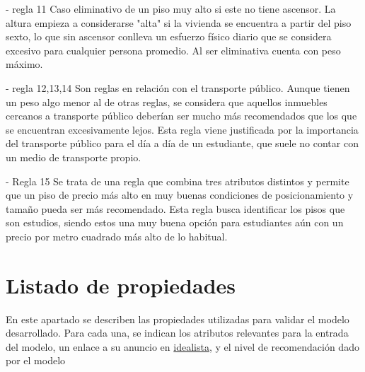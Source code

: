 \documentclass[12pt]{report} %
\begin{document}
    - regla 11
    Caso eliminativo de un piso muy alto si este no tiene ascensor. La altura empieza a 
    considerarse "alta" si la vivienda se encuentra a partir del piso sexto, lo que sin ascensor 
    conlleva un esfuerzo físico diario que se considera excesivo para cualquier persona promedio. 
    Al ser eliminativa cuenta con peso máximo.

    - regla 12,13,14
    Son reglas en relación con el transporte público. Aunque tienen un peso algo menor al de otras
    reglas, se considera que aquellos inmuebles cercanos a transporte público deberían ser mucho 
    más recomendados que los que se encuentran excesivamente lejos. Esta regla viene justificada
    por la importancia del transporte público para el día a día de un estudiante, que suele no contar 
    con un medio de transporte propio.

    - Regla 15
    Se trata de una regla que combina tres atributos distintos y permite que un piso de precio más 
    alto en muy buenas condiciones de posicionamiento y tamaño pueda ser más recomendado. Esta regla busca 
    identificar los pisos que son estudios, siendo estos una muy buena opción para estudiantes aún con 
    un precio por metro cuadrado más alto de lo habitual. 

    \chapter{Listado de propiedades}
    \label{chap:propiedades}
    En este apartado se describen las propiedades utilizadas para validar el
    modelo desarrollado. Para cada una, se indican los atributos relevantes para
    la entrada del modelo, un enlace a su anuncio en
    \href{https://www.idealista.com}{idealista}, y el nivel de recomendación
    dado por el modelo
\end{document}
